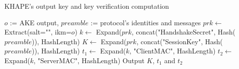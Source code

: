 ﻿\documentclass[../report.tex]{subfiles}
\begin{document}
\begin{algorithm}
\caption{KHAPE's output key and key verification computation}
\label{alg:key_derivation_2}
\begin{algorithmic}
\Require $o$ := AKE output, $preamble$ := protocol's identities and messages
\State $prk \gets$ Extract(salt="", ikm=$o$)
\State $k \gets$ Expand($prk$, concat("HandshakeSecret", Hash($preamble$)), HashLength)
\State $K \gets$ Expand($prk$, concat("SessionKey", Hash($preamble$)), HashLength)
\State $t_1 \gets$ Expand($k$, "ClientMAC", HashLength)
\State $t_2 \gets$ Expand($k$, "ServerMAC", HashLength)
\State Output $K$, $t_1$ and $t_2$
\end{algorithmic}
\end{algorithm}


% 
% 
% 
% 
% 
% 
% 
% 
% 
% 
% 
\end{document}
